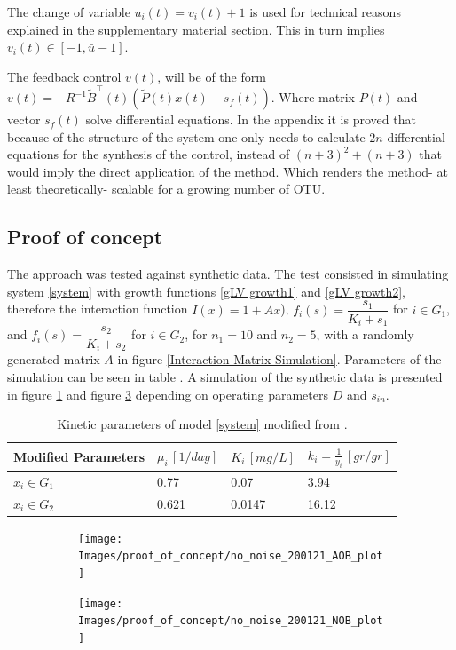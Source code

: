 \documentclass[3p,times]{elsarticle}
\begin{document}
The change of variable $u_i(t) = v_i(t) + 1$ is used for technical reasons explained in the supplementary material section. This in turn implies $v_i(t) \in [-1,\bar{u}-1]$.

The feedback control $v(t)$, will be of the form $v(t) = -R^{-1}\tilde{B}^\top(t)\left(\tilde{P}(t)x(t)-s_f(t)\right)$. Where matrix $P(t)$ and vector $s_f(t)$ solve differential equations. In the appendix it is proved that because of the structure of the system one only needs to calculate $2n$ differential equations for the synthesis of the control, instead of $(n+3)^2 + (n+3)$ that would imply the direct application of the method. Which renders the method- at least theoretically- scalable for a growing number of OTU.

\subsection{Proof of concept}

The approach was tested against synthetic data. The test consisted in simulating system \eqref{system} with growth functions \eqref{gLV growth1} and \eqref{gLV growth2}, therefore the interaction function $I(x) = 1 + Ax$), $f_i(s) = \dfrac{s_1}{K_i +s_1}$ for $i \in G_1$, and $f_i(s) = \dfrac{s_2}{K_i +s_2}$ for $i \in G_2$, for $n_1 = 10$ and $n_2 = 5$, with a randomly generated matrix $A$ in figure \ref{Interaction Matrix Simulation}. Parameters of the simulation can be seen in table . A simulation of the synthetic data is presented in figure \ref{fig:nonoise200121aobplot} and figure \ref{fig:nonoise200121nobplot} depending on operating parameters $D$ and $s_{in}$. 


\begin{table}[ht]
	\centering
	\begin{tabular}{|l|l|l|l|}
		\hline
		Modified Parameters  & $\mu_i\,[1/day]$ & $K_i\,[mg/L]$ & $k_i =\frac{1}{y_i} \, [gr/gr]$ \\ \hline
		$x_i \in G_1$ &0.77  &0.07  & 3.94 \\ \hline
		$x_i\in G_2$ & 0.621 & 0.0147 & 16.12 \\ \hline
	\end{tabular}
	\caption{Kinetic parameters of model \eqref{system} modified from \cite{Dumont2016}.}
	\label{Parameters_synthetic_data}
\end{table}

\begin{figure}[h]
	\centering
	\begin{subfigure}{0.45 \linewidth}
	\texttt{[image: Images/proof\_of\_concept/no\_noise\_200121\_AOB\_plot]}
	\caption{}
	\label{fig:nonoise200121aobplot}
	\end{subfigure}
	\begin{subfigure}{0.45 \linewidth}
	\centering
	\texttt{[image: Images/proof\_of\_concept/no\_noise\_200121\_NOB\_plot]}
	\caption{}
	\label{fig:nonoise200121nobplot}
	\end{subfigure}
\caption{}
\end{figure}
\end{document}
